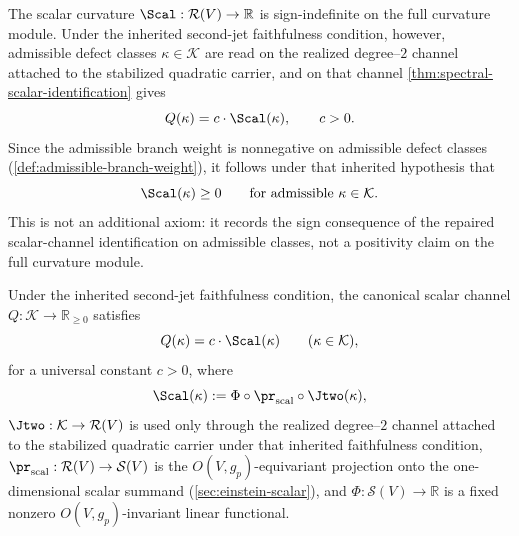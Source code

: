 \begin{remark}
\label{rem:scal-sign}
The scalar curvature $\Scal : \mathcal R(V) \to \mathbb R$ is
sign-indefinite on the full curvature module.
Under the inherited second-jet faithfulness condition, however,
admissible defect classes $\kappa\in\mathcal K$ are read on the
realized degree--\(2\) channel attached to the stabilized quadratic
carrier, and on that channel
\cref{thm:spectral-scalar-identification} gives
\[
  Q(\kappa) = c \cdot \Scal(\kappa),
  \qquad c>0.
\]
Since the admissible branch weight is nonnegative on admissible defect
classes (\cref{def:admissible-branch-weight}), it follows under that
inherited hypothesis that
\[
  \Scal(\kappa) \ge 0
  \qquad \text{for admissible } \kappa \in \mathcal K.
\]
This is not an additional axiom: it records the sign consequence of
the repaired scalar-channel identification on admissible classes, not
a positivity claim on the full curvature module.
\end{remark}

\begin{theorem}
\label{thm:spectral-scalar-identification}
Under the inherited second-jet faithfulness condition, the canonical
scalar channel
$Q : \mathcal K \to \mathbb R_{\geq 0}$ satisfies
\[
  Q(\kappa) = c \cdot \Scal(\kappa)
  \qquad (\kappa \in \mathcal K),
\]
for a universal constant $c > 0$, where
\[
  \Scal(\kappa) := \Phi \circ \pr_{\mathrm{scal}} \circ \Jtwo(\kappa),
\]
$\Jtwo : \mathcal K \to \mathcal R(V)$ is used only through
the realized degree--\(2\) channel attached to the stabilized
quadratic carrier under that inherited faithfulness condition,
$\pr_{\mathrm{scal}} : \mathcal R(V) \to \mathcal S(V)$ is the
$O(V,g_p)$-equivariant projection onto the one-dimensional scalar
summand (\cref{sec:einstein-scalar}), and
$\Phi : \mathcal S(V) \to \mathbb R$ is a fixed nonzero $O(V,g_p)$-invariant
linear functional.
\end{theorem}

